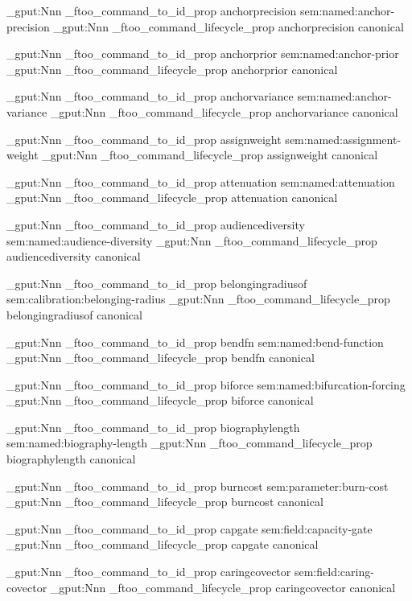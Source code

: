 \prop_gput:Nnn \g_ftoo_command_to_id_prop { anchorprecision } { sem:named:anchor-precision }
\prop_gput:Nnn \g_ftoo_command_lifecycle_prop { anchorprecision } { canonical }


\prop_gput:Nnn \g_ftoo_command_to_id_prop { anchorprior } { sem:named:anchor-prior }
\prop_gput:Nnn \g_ftoo_command_lifecycle_prop { anchorprior } { canonical }


\prop_gput:Nnn \g_ftoo_command_to_id_prop { anchorvariance } { sem:named:anchor-variance }
\prop_gput:Nnn \g_ftoo_command_lifecycle_prop { anchorvariance } { canonical }


\prop_gput:Nnn \g_ftoo_command_to_id_prop { assignweight } { sem:named:assignment-weight }
\prop_gput:Nnn \g_ftoo_command_lifecycle_prop { assignweight } { canonical }


\prop_gput:Nnn \g_ftoo_command_to_id_prop { attenuation } { sem:named:attenuation }
\prop_gput:Nnn \g_ftoo_command_lifecycle_prop { attenuation } { canonical }


\prop_gput:Nnn \g_ftoo_command_to_id_prop { audiencediversity } { sem:named:audience-diversity }
\prop_gput:Nnn \g_ftoo_command_lifecycle_prop { audiencediversity } { canonical }


\prop_gput:Nnn \g_ftoo_command_to_id_prop { belongingradiusof } { sem:calibration:belonging-radius }
\prop_gput:Nnn \g_ftoo_command_lifecycle_prop { belongingradiusof } { canonical }


\prop_gput:Nnn \g_ftoo_command_to_id_prop { bendfn } { sem:named:bend-function }
\prop_gput:Nnn \g_ftoo_command_lifecycle_prop { bendfn } { canonical }


\prop_gput:Nnn \g_ftoo_command_to_id_prop { biforce } { sem:named:bifurcation-forcing }
\prop_gput:Nnn \g_ftoo_command_lifecycle_prop { biforce } { canonical }


\prop_gput:Nnn \g_ftoo_command_to_id_prop { biographylength } { sem:named:biography-length }
\prop_gput:Nnn \g_ftoo_command_lifecycle_prop { biographylength } { canonical }


\prop_gput:Nnn \g_ftoo_command_to_id_prop { burncost } { sem:parameter:burn-cost }
\prop_gput:Nnn \g_ftoo_command_lifecycle_prop { burncost } { canonical }


\prop_gput:Nnn \g_ftoo_command_to_id_prop { capgate } { sem:field:capacity-gate }
\prop_gput:Nnn \g_ftoo_command_lifecycle_prop { capgate } { canonical }


\prop_gput:Nnn \g_ftoo_command_to_id_prop { caringcovector } { sem:field:caring-covector }
\prop_gput:Nnn \g_ftoo_command_lifecycle_prop { caringcovector } { canonical }


